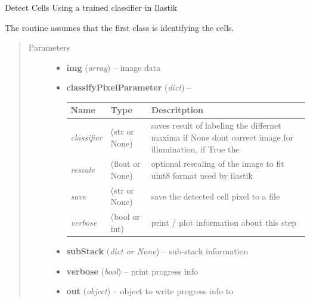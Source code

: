 \documentclass[letterpaper,10pt,english]{sphinxmanual}
\begin{document}

\begin{fulllineitems}
\label{api/ClearMap.ImageProcessing:ClearMap.ImageProcessing.IlastikClassification.classifyCells}
Detect Cells Using a trained classifier in Ilastik

The routine assumes that the first class is identifying the cells.
\begin{quote}\begin{description}
\item[{Parameters}] \leavevmode\begin{itemize}
\item {} 
\textbf{img} (\emph{array}) --
image data

\item {} 
\textbf{classifyPixelParameter} (\emph{dict}) --

\begin{tabulary}{\linewidth}{|L|L|L|}
\hline
\textsf{\relax 
Name
} & \textsf{\relax 
Type
} & \textsf{\relax 
Descritption
}\\
\hline
\emph{classifier}
 & 
(str or  None)
 & 
saves result of labeling the differnet maxima
if None dont correct image for illumination, if True the
\\
\hline
\emph{rescale}
 & 
(float or None)
 & 
optional rescaling of the image to fit uint8 format
used by ilastik
\\
\hline
\emph{save}
 & 
(str or None)
 & 
save the detected cell pixel to a file
\\
\hline
\emph{verbose}
 & 
(bool or int)
 & 
print / plot information about this step
\\
\hline\end{tabulary}


\item {} 
\textbf{subStack} (\emph{dict or None}) --
sub-stack information

\item {} 
\textbf{verbose} (\emph{bool}) --
print progress info

\item {} 
\textbf{out} (\emph{object}) --
object to write progress info to


\end{itemize}
\end{description}
\end{quote}
\end{fulllineitems}
\end{document}
